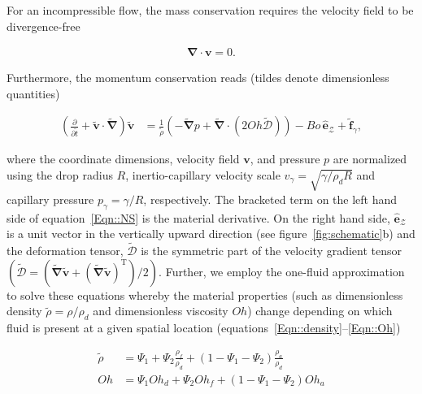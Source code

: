 \documentclass[]{jfm}
\begin{document}
	For an incompressible flow, the mass conservation requires the velocity field to be divergence-free
	
	\begin{align}
		\boldsymbol{\nabla\cdot v} = 0.
	\end{align}  
	
	\noindent Furthermore, the momentum conservation  reads (tildes denote dimensionless quantities)
	
	\begin{align}
		\label{Eqn::NS}
		\left(\frac{\partial}{\partial \tilde{t}} + \boldsymbol{\tilde{v}\cdot\tilde{\nabla}}\right)\boldsymbol{\tilde{v}} &= \frac{1}{\tilde{\rho}}\left(-\boldsymbol{\tilde{\nabla}} p + \boldsymbol{\tilde{\nabla}\cdot}\left(2Oh\boldsymbol{\tilde{\mathcal{D}}}\right)\right) - Bo\,\boldsymbol{\hat{e}}_{\boldsymbol{\mathcal{Z}}} + \boldsymbol{\tilde{f}}_\gamma,
	\end{align}
	
	\noindent where the coordinate dimensions, velocity field $\boldsymbol{v}$, and pressure $p$ are normalized using the drop radius $R$, inertio-capillary velocity scale $v_\gamma = \sqrt{\gamma/\rho_d R}$ and capillary pressure $p_\gamma = \gamma/R$, respectively. The bracketed term on the left hand side of equation~\eqref{Eqn::NS} is the material derivative. On the right hand side, $\boldsymbol{\hat{e}}_{\boldsymbol{\mathcal{Z}}}$ is a unit vector in the vertically upward direction (see figure~\ref{fig:schematic}b) and the deformation tensor, $\boldsymbol{\tilde{\mathcal{D}}}$ is the symmetric part of the velocity gradient tensor $\left(\boldsymbol{\tilde{\mathcal{D}}} = \left(\boldsymbol{\tilde{\nabla}\tilde{v}} + \left(\boldsymbol{\tilde{\nabla}\tilde{v}}\right)^{\text{T}}\right)/2\right)$. Further, we employ the one-fluid approximation \citep{tryggvason2011direct} to solve these equations whereby the material properties (such as dimensionless density $\tilde{\rho} = \rho/\rho_d$ and dimensionless viscosity $Oh$) change depending on which fluid is present at a given spatial location (equations~\eqref{Eqn::density}--\eqref{Eqn::Oh})
	
	\begin{align}
		\label{Eqn::density}
		\tilde{\rho} &= \Psi_1 + \Psi_2\frac{\rho_{f}}{\rho_{d}} + \left(1-\Psi_1-\Psi_2\right)\frac{\rho_{a}}{\rho_{d}}\\
		\label{Eqn::Oh}
		Oh &= \Psi_1Oh_d + \Psi_2Oh_f + \left(1-\Psi_1-\Psi_2\right)Oh_a
	\end{align}
	
\end{document}
